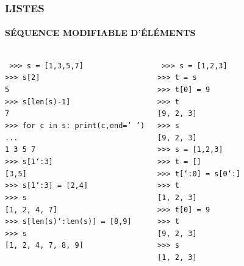 \begin{frame}
\frametitle{\uppercase{Listes}}
\framesubtitle{\uppercase{séquence modifiable d'éléments}}

\begin{columns}[T]
\column{5.25cm}
\begin{py}{5.25cm}\tt
>{>}> s = [1,3,5,7]\\%
>{>}> s[2]\\
5\\%
>{>}> s[len(s)-1]\\
7\\%
>{>}> for c in s: print(c,end=' ')\\
... \\
1 3 5 7\\%
>{>}> s[1\char`:3]\\
\mbox{}[3,5]\\%
>{>}> s[1\char`:3] = [2,4]\\
>{>}> s\\
\mbox{}[1, 2, 4, 7]\\%
>{>}> s[len(s)\char`:len(s)] = [8,9]\\
>{>}> s\\
\mbox{}[1, 2, 4, 7, 8, 9]
\end{py}

\column{5.25cm}
\begin{py}{5.25cm}\tt
>{>}> s = [1,2,3]\\
>{>}> t = s\\
>{>}> t[0] = 9\\
>{>}> t\\
\mbox{}[9, 2, 3]\\
>{>}> s\\
\mbox{}[9, 2, 3]\\%
>{>}> s = [1,2,3]\\
>{>}> t = []\\
>{>}> t[\char`:0] = s[0\char`:]\\
>{>}> t\\
\mbox{}[1, 2, 3]\\%
>{>}> t[0] = 9\\
>{>}> t\\
\mbox{}[9, 2, 3]\\
>{>}> s\\
\mbox{}[1, 2, 3]
\end{py}
\end{columns}

\end{frame}
